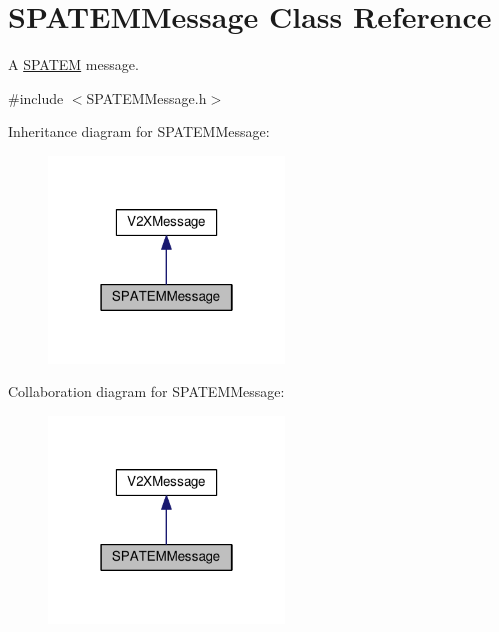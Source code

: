 \hypertarget{classSPATEMMessage}{}\section{S\+P\+A\+T\+E\+M\+Message Class Reference}
\label{classSPATEMMessage}


A \hyperlink{structSPATEM}{S\+P\+A\+T\+EM} message.  




{\ttfamily \#include $<$S\+P\+A\+T\+E\+M\+Message.\+h$>$}



Inheritance diagram for S\+P\+A\+T\+E\+M\+Message\+:\nopagebreak
\begin{figure}[H]
\begin{center}
\leavevmode
\includegraphics[width=178pt]{classSPATEMMessage__inherit__graph}
\end{center}
\end{figure}


Collaboration diagram for S\+P\+A\+T\+E\+M\+Message\+:\nopagebreak
\begin{figure}[H]
\begin{center}
\leavevmode
\includegraphics[width=178pt]{classSPATEMMessage__coll__graph}
\end{center}
\end{figure}
